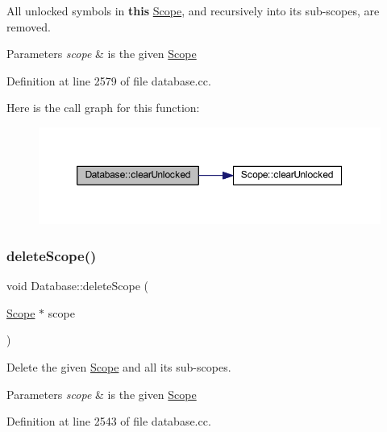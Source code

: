 All unlocked symbols in {\bfseries{this}} \mbox{\hyperlink{class_scope}{Scope}}, and recursively into its sub-\/scopes, are removed. 
\begin{DoxyParams}{Parameters}
{\em scope} & is the given \mbox{\hyperlink{class_scope}{Scope}} \\
\hline
\end{DoxyParams}


Definition at line 2579 of file database.\+cc.

Here is the call graph for this function\+:
\nopagebreak
\begin{figure}[H]
\begin{center}
\leavevmode
\includegraphics[width=350pt]{class_database_ab7749ce6cebbb4f7520baa7a6177ab33_cgraph}
\end{center}
\end{figure}
\mbox{\label{class_database_aa7b4011d64dc04148fbf342819f38da5}} 
\subsubsection{\texorpdfstring{deleteScope()}{deleteScope()}}
{\footnotesize\ttfamily void Database\+::delete\+Scope (\begin{DoxyParamCaption}\item[{\mbox{\hyperlink{class_scope}{Scope}} $\ast$}]{scope }\end{DoxyParamCaption})}



Delete the given \mbox{\hyperlink{class_scope}{Scope}} and all its sub-\/scopes. 


\begin{DoxyParams}{Parameters}
{\em scope} & is the given \mbox{\hyperlink{class_scope}{Scope}} \\
\hline
\end{DoxyParams}


Definition at line 2543 of file database.\+cc.

